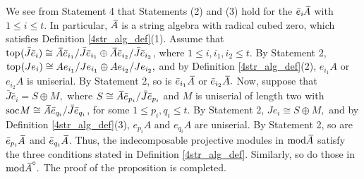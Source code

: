 \documentclass[10pt]{amsart}
\theoremstyle{definition}
\newcommand{\mmod}{{\rm mod}}
\newcommand{\soc}{{\rm soc}\hspace{.5pt}}
\newcommand{\ntop}{{\rm top}\hspace{.5pt}}
\begin{document}
We see from Statement 4 that Statements (2) and (3) hold for the $\bar e_i \hspace{2pt}\overline{\hspace{-2.8pt}A}$ with $1\le i\le t$. In particular, $\hspace{2pt}\overline{\hspace{-2.8pt}A}$ is a string algebra with radical cubed zero, which satisfies Definition \ref{4str_alg_def}(1). Assume that $\ntop(\bar J \bar e_i)\cong \hspace{2.8pt}\overline{\hspace{-2.8pt}A} \bar e_{i_1}/\bar J \bar e_{i_1} \oplus \hspace{2.8pt}\overline{\hspace{-2.8pt}A} \bar e_{i_2}/\bar J \bar e_{i_2}$, where $1\le i, i_1, i_2\le t$. By Statement 2, $\ntop(Je_i)\cong  A e_{i_1}/ J e_{i_1} \oplus  A e_{i_2}/ J e_{i_2},$   and by Definition \ref{4str_alg_def}(2), $e_{i_1}A$ or $e_{i_2}A$ is uniserial. By Statement 2, so is $\bar e_{i_1} \hspace{2.8pt}\overline{\hspace{-2.8pt}A}$ or $\bar e_{i_2}\hspace{2.8pt}\overline{\hspace{-2.8pt}A}.$ Now, suppose that $\bar J \bar e_i = S \oplus M,$ where $S\cong \hspace{2.8pt}\overline{\hspace{-2.8pt}A} \bar e_{p_i} / \bar J \bar e_{p_i}$ and $M$ is uniserial of length two with $\soc M\cong \hspace{2.8pt}\overline{\hspace{-2.8pt}A} \bar e_{q_i} / \bar J \bar e_{q_i}$, for some $1\le p_i, q_i\le t.$ By Statement 2, $J e_i \cong S \oplus M,$ and by Definition \ref{4str_alg_def}(3), $e_{p_i}A$ and $e_{q_i}A$ are uniserial. By Statement 2, so are $\bar e_{p_i}\hspace{2.8pt}\overline{\hspace{-2.8pt}A}$ and $\bar e_{q_i}\hspace{2.8pt}\overline{\hspace{-2.8pt}A}$. \vspace{-1pt} Thus, the indecomposable projective modules in $\mmod \hspace{2.8pt}\overline{\hspace{-2.8pt}A}$ satisfy the three conditions stated in Definition \ref{4str_alg_def}. Similarly, so do those in $\mmod \hspace{2.8pt}\overline{\hspace{-2.8pt}A}^\circ.$ The proof of the proposition is completed.
\end{document}
